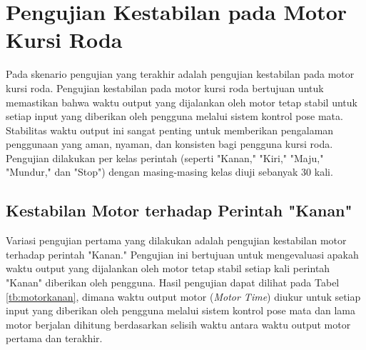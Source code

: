 \section{Pengujian Kestabilan pada Motor Kursi Roda}

Pada skenario pengujian yang terakhir adalah pengujian kestabilan pada motor kursi roda. Pengujian kestabilan pada motor kursi roda bertujuan untuk memastikan bahwa waktu output yang dijalankan oleh motor tetap stabil untuk setiap input yang diberikan oleh pengguna melalui sistem kontrol pose mata. Stabilitas waktu output ini sangat penting untuk memberikan pengalaman penggunaan yang aman, nyaman, dan konsisten bagi pengguna kursi roda. Pengujian dilakukan per kelas perintah (seperti "Kanan," "Kiri," "Maju," "Mundur," dan "Stop") dengan masing-masing kelas diuji sebanyak 30 kali.

\subsection{Kestabilan Motor terhadap Perintah "Kanan"}

Variasi pengujian pertama yang dilakukan adalah pengujian kestabilan motor terhadap perintah "Kanan." Pengujian ini bertujuan untuk mengevaluasi apakah waktu output yang dijalankan oleh motor tetap stabil setiap kali perintah "Kanan" diberikan oleh pengguna. Hasil pengujian dapat dilihat pada Tabel \ref{tb:motorkanan}, dimana waktu output motor (\emph{Motor Time}) diukur untuk setiap input yang diberikan oleh pengguna melalui sistem kontrol pose mata dan lama motor berjalan dihitung berdasarkan selisih waktu antara waktu output motor pertama dan terakhir.


